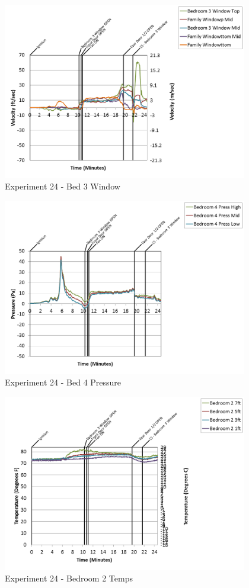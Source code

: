 \documentclass{article}
\begin{document}
\begin{appendices}
\clearpage

\begin{figure}[h!]
	\centering
	\includegraphics[height=3.05in]{0_Images/Results_Charts/Exp_24_Charts/Bed3Window.png}
	\caption{Experiment 24 - Bed 3 Window}
\end{figure}


\begin{figure}[h!]
	\centering
	\includegraphics[height=3.05in]{0_Images/Results_Charts/Exp_24_Charts/Bed4Pressure.png}
	\caption{Experiment 24 - Bed 4 Pressure}
\end{figure}

\clearpage

\begin{figure}[h!]
	\centering
	\includegraphics[height=3.05in]{0_Images/Results_Charts/Exp_24_Charts/Bedroom2Temps.png}
	\caption{Experiment 24 - Bedroom 2 Temps}
\end{figure}



\end{appendices}
\end{document}
